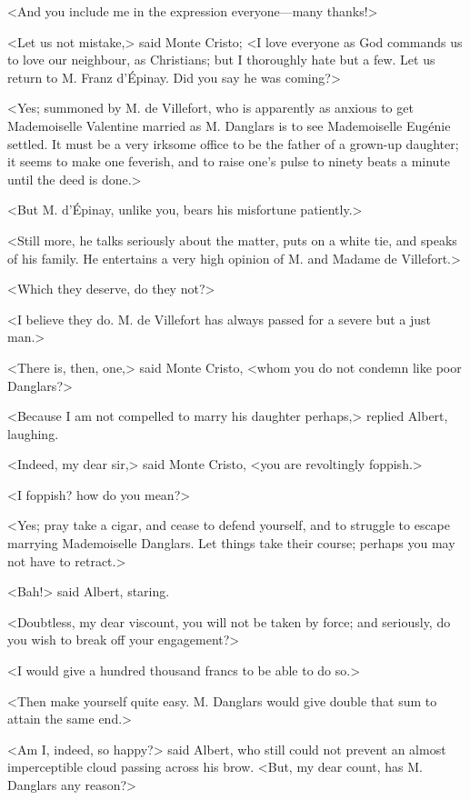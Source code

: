  <And you include me in the expression everyone—many thanks!> 

 <Let us not mistake,> said Monte Cristo; <I love everyone as God commands us to love our neighbour, as Christians; but I thoroughly hate but a few. Let us return to M. Franz d'Épinay. Did you say he was coming?> 

 <Yes; summoned by M. de Villefort, who is apparently as anxious to get Mademoiselle Valentine married as M. Danglars is to see Mademoiselle Eugénie settled. It must be a very irksome office to be the father of a grown-up daughter; it seems to make one feverish, and to raise one's pulse to ninety beats a minute until the deed is done.> 

 <But M. d'Épinay, unlike you, bears his misfortune patiently.> 

 <Still more, he talks seriously about the matter, puts on a white tie, and speaks of his family. He entertains a very high opinion of M. and Madame de Villefort.> 

 <Which they deserve, do they not?> 

 <I believe they do. M. de Villefort has always passed for a severe but a just man.> 

 <There is, then, one,> said Monte Cristo, <whom you do not condemn like poor Danglars?> 

 <Because I am not compelled to marry his daughter perhaps,> replied Albert, laughing. 

 <Indeed, my dear sir,> said Monte Cristo, <you are revoltingly foppish.> 

 <I foppish? how do you mean?> 

 <Yes; pray take a cigar, and cease to defend yourself, and to struggle to escape marrying Mademoiselle Danglars. Let things take their course; perhaps you may not have to retract.> 

 <Bah!> said Albert, staring. 

 <Doubtless, my dear viscount, you will not be taken by force; and seriously, do you wish to break off your engagement?> 

 <I would give a hundred thousand francs to be able to do so.> 

 <Then make yourself quite easy. M. Danglars would give double that sum to attain the same end.> 

 <Am I, indeed, so happy?> said Albert, who still could not prevent an almost imperceptible cloud passing across his brow. <But, my dear count, has M. Danglars any reason?> 

